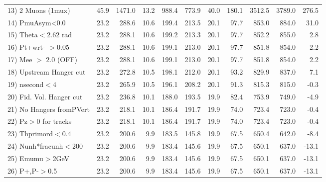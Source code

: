 \begin{table}[h!]
{{\begin{tabular}{||l||r|r|r|r|r|r|r||r||r||r||}
 13) 2 Muons (1mux)       &      45.9 &    1471.0 &      13.2 &     988.4 &     773.9 &      40.0 &     180.1 &    3512.5 &    3789.0 &     276.5 \\
 14) PmuAsym<0.0          &      23.2 &     288.6 &      10.6 &     199.4 &     213.5 &      20.1 &      97.7 &     853.0 &     884.0 &      31.0 \\
 15) Theta$<$2.62 rad     &      23.2 &     288.1 &      10.6 &     199.2 &     213.3 &      20.1 &      97.7 &     852.2 &     855.0 &       2.8 \\
 16) Pt+wrt- $>$0.05      &      23.2 &     288.1 &      10.6 &     199.1 &     213.0 &      20.1 &      97.7 &     851.8 &     854.0 &       2.2 \\
 17) Mee $>$ 2.0  (OFF)   &      23.2 &     288.1 &      10.6 &     199.1 &     213.0 &      20.1 &      97.7 &     851.8 &     854.0 &       2.2 \\
 18) Upstream Hanger cut  &      23.2 &     272.8 &      10.5 &     198.1 &     212.0 &      20.1 &      93.2 &     829.9 &     837.0 &       7.1 \\
 19) nsecond$<$4          &      23.2 &     265.9 &      10.5 &     196.1 &     208.2 &      20.1 &      91.3 &     815.3 &     815.0 &      -0.3 \\
 20) Fid. Vol. Hanger cut &      23.2 &     236.8 &      10.1 &     188.0 &     193.5 &      19.9 &      82.4 &     753.9 &     749.0 &      -4.9 \\
 21) No Hangers fromPVert &      23.2 &     218.1 &      10.1 &     186.4 &     191.7 &      19.9 &      74.0 &     723.4 &     723.0 &      -0.4 \\
 22) Pz$>$0 for tracks    &      23.2 &     218.1 &      10.1 &     186.4 &     191.7 &      19.9 &      74.0 &     723.4 &     723.0 &      -0.4 \\
 23) Thprimord$<$0.4      &      23.2 &     200.6 &       9.9 &     183.5 &     145.8 &      19.9 &      67.5 &     650.4 &     642.0 &      -8.4 \\
 24) Nunh*fracunh$<$200   &      23.2 &     200.6 &       9.9 &     183.4 &     145.6 &      19.9 &      67.5 &     650.1 &     637.0 &     -13.1 \\
 25) Emumu$>$2GeV         &      23.2 &     200.6 &       9.9 &     183.4 &     145.6 &      19.9 &      67.5 &     650.1 &     637.0 &     -13.1 \\
 26) P+,P-$>$0.5          &      23.2 &     200.6 &       9.9 &     183.4 &     145.6 &      19.9 &      67.5 &     650.1 &     637.0 &     -13.1 \\

\end{tabular}}}
\end{table}
